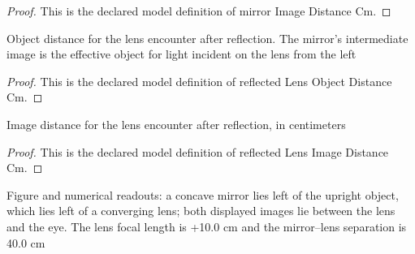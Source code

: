 \begin{proof}
  This is the declared model definition of mirror Image Distance Cm.
\end{proof}
\begin{definition}
  \label{def:physics:phyx-mini-0034:phyxminiproblems-problemphyxmini0034-reflectedlensobjectdistancecm}
  Object distance for the lens encounter after reflection. The mirror's intermediate image is the effective object for light incident on the lens from the left
\end{definition}
\begin{proof}
  This is the declared model definition of reflected Lens Object Distance Cm.
\end{proof}
\begin{definition}
  \label{def:physics:phyx-mini-0034:phyxminiproblems-problemphyxmini0034-reflectedlensimagedistancecm}
  Image distance for the lens encounter after reflection, in centimeters
\end{definition}
\begin{proof}
  This is the declared model definition of reflected Lens Image Distance Cm.
\end{proof}
\begin{definition}
  \label{def:physics:phyx-mini-0034:phyxminiproblems-problemphyxmini0034-matchesfigureandgivenlengths}
  Figure and numerical readouts: a concave mirror lies left of the upright object, which lies left of a converging lens; both displayed images lie between the lens and the eye. The lens focal length is +10.0 cm and the mirror--lens separation is 40.0 cm
\end{definition}
